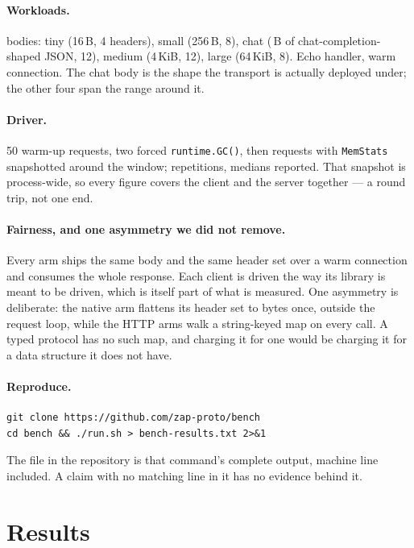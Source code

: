 \documentclass[11pt]{article}
\begin{document}
\paragraph{Workloads.} \NWorkloads{} bodies: tiny (16\,B, 4 headers), small
(256\,B, 8), chat (\bodyChat\,B of chat-completion-shaped JSON, 12), medium
(4\,KiB, 12), large (64\,KiB, 8). Echo handler, warm connection. The chat body is the shape the
transport is actually deployed under; the other four span the range around it.

\paragraph{Driver.} 50 warm-up requests, two forced \texttt{runtime.GC()}, then
\memReqs{} requests with \texttt{MemStats} snapshotted around the window; \nReps{}
repetitions, medians reported. That snapshot is process-wide, so every figure
covers the client and the server together --- a round trip, not one end.

\paragraph{Fairness, and one asymmetry we did not remove.} Every arm ships the
same body and the same header set over a warm connection and consumes the whole
response. Each client is driven the way its library is meant to be driven, which
is itself part of what is measured. One asymmetry is deliberate: the native arm
flattens its header set to bytes once, outside the request loop, while the HTTP
arms walk a string-keyed map on every call. A typed protocol has no such map, and
charging it for one would be charging it for a data structure it does not have.

\paragraph{Reproduce.}
\begin{lstlisting}[basicstyle=\ttfamily\small,frame=single,backgroundcolor=\color{gray!10}]
git clone https://github.com/zap-proto/bench
cd bench && ./run.sh > bench-results.txt 2>&1
\end{lstlisting}
The file in the repository is that command's complete output, machine line
included. A claim with no matching line in it has no evidence behind it.

\section{Results}
\end{document}
